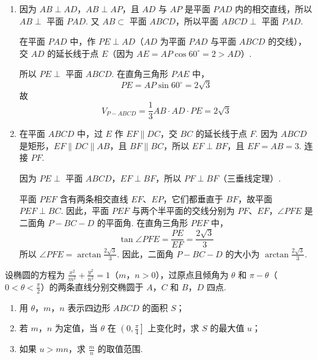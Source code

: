 \begin{solution}
\begin{enumerate}
\item 因为 \(AB\perp AD\)，\(AB\perp AP\)，且 \(AD\) 与 \(AP\) 是平面 \(PAD\) 内的相交直线，所以 \(AB\perp\) 平面 \(PAD\). 又 \(AB\subset\) 平面 \(ABCD\)，所以平面 \(ABCD\perp\) 平面 \(PAD\).

在平面 \(PAD\) 中，作 \(PE\perp AD\)（\(AD\) 为平面 \(PAD\) 与平面 \(ABCD\) 的交线），交 \(AD\) 的延长线于点 \(E\)（因为 \(AE=AP\cos60^\circ=2>AD\)）.

所以 \(PE\perp\) 平面 \(ABCD\). 在直角三角形 \(PAE\) 中，
\[
PE=AP\sin60^\circ=2\sqrt{3}
\]
故
\[
V_{P-ABCD}=\frac{1}{3}AB\cdot AD\cdot PE=2\sqrt{3}
\]

\item 在平面 \(ABCD\) 中，过 \(E\) 作 \(EF\parallel DC\)，交 \(BC\) 的延长线于点 \(F\). 因为 \(ABCD\) 是矩形，\(EF\parallel DC\parallel AB\)，且 \(BF\parallel BC\)，所以 \(EF\perp BF\)，且 \(EF=AB=3\). 连接 \(PF\).

因为 \(PE\perp\) 平面 \(ABCD\)，\(EF\perp BF\)，所以 \(PF\perp BF\)（三垂线定理）.

平面 \(PEF\) 含有两条相交直线 \(EF\)、\(EP\)，它们都垂直于 \(BF\)，故平面 \(PEF\perp BC\). 因此，平面 \(PEF\) 与两个半平面的交线分别为 \(PF\)、\(EF\)，\(\angle PFE\) 是二面角 \(P-BC-D\) 的平面角. 在直角三角形 \(PEF\) 中，
\[
\tan\angle PFE=\frac{PE}{EF}=\frac{2\sqrt{3}}{3}
\]
所以 \(\angle PFE=\arctan\frac{2\sqrt{3}}{3}\). 因此，二面角 \(P-BC-D\) 的大小为 \(\arctan\frac{2\sqrt{3}}{3}\).
\end{enumerate}
\end{solution}

\begin{problem}
设椭圆的方程为 \(\frac{x^2}{m^2}+\frac{y^2}{n^2}=1\)（\(m\)，\(n>0\)），过原点且倾角为 \(\theta\) 和 \(\pi-\theta\)（\(0<\theta<\frac{\pi}{2}\)）的两条直线分别交椭圆于 \(A\)，\(C\) 和 \(B\)，\(D\) 四点.

\begin{enumerate}
\item 用 \(\theta\)，\(m\)，\(n\) 表示四边形 \(ABCD\) 的面积 \(S\)；
\item 若 \(m\)，\(n\) 为定值，当 \(\theta\) 在 \(\left(0,\frac{\pi}{4}\right]\) 上变化时，求 \(S\) 的最大值 \(u\)；
\item 如果 \(u>mn\)，求 \(\frac{m}{n}\) 的取值范围.
\end{enumerate}
\end{problem}

